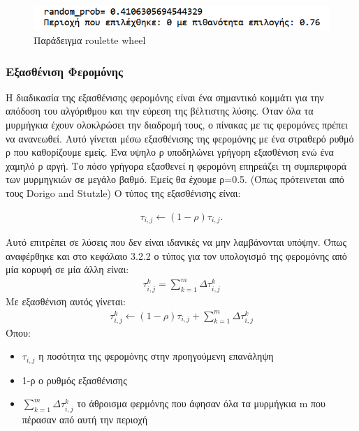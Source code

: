 \begin{figure}
    \centering
    \includegraphics[scale=1]{2947_thesis/pictures/roulette_wheel_example.png} 
    \caption{Παράδειγμα roulette wheel}
    \label{roulette}
\end{figure}


\subsubsection{Εξασθένιση Φερομόνης}

Η διαδικασία της εξασθένισης φερομόνης είναι ένα σημαντικό κομμάτι για την απόδοση του αλγόριθμου και την εύρεση της βέλτιστης λύσης. Όταν όλα τα μυρμήγκια έχουν ολοκλρώσει την διαδρομή τους, ο πίνακας με τις φερομόνες πρέπει να ανανεωθεί. Αυτό γίνεται μέσω εξασθένισης της φερομόνης με ένα στραθερό ρυθμό ρ που καθορίζουμε εμείς. Ένα υψηλο ρ υποδηλώνει γρήγορη εξασθένιση ενώ ένα χαμηλό ρ αργή. Το πόσο γρήγορα εξασθενεί η φερομόνη επηρεάζει τη συμπεριφορά των μυρμηγκιών σε μεγάλο βαθμό. \cite{Dawson-Stewart} Εμείς θα έχουμε ρ=0.5. (Όπως πρότεινεται από τους Dorigo and Stutzle) \cite{Dorigo-Stützle} Ο τύπος της εξασθένισης είναι: 

\begin{align}
	τ_{i,j}\leftarrow(1-ρ)τ_{i,j}.
\end{align}

Αυτό επιτρέπει σε λύσεις που δεν είναι ιδανικές να μην λαμβάνονται υπόψην. Όπως αναφέρθηκε και στο κεφάλαιο 3.2.2 ο τύπος για τον υπολογισμό της φερομόνης από μία κορυφή σε μία άλλη είναι: 
\begin{align}
    τ_{i,j}^k=\sum_{k=1}^{m}{Δτ^k_{i,j}}
\end{align}
Με εξασθένιση αυτός γίνεται: 
\begin{align}
    τ_{i,j}^k\leftarrow(1-ρ)τ_{i,j}+\sum_{k=1}^{m}{Δτ^k_{i,j}}
\end{align}
Όπου: 
\begin{itemize}
    \item $τ_{i,j}$ η ποσότητα της φερομόνης στην προηγούμενη επανάληψη
    \item 1-ρ ο ρυθμός εξασθένισης
    \item $\sum_{k=1}^{m}{Δτ^k_{i,j}}$ το άθροισμα φερμόνης που άφησαν όλα τα μυρμήγκια m που πέρασαν από αυτή την περιοχή
\end{itemize}

